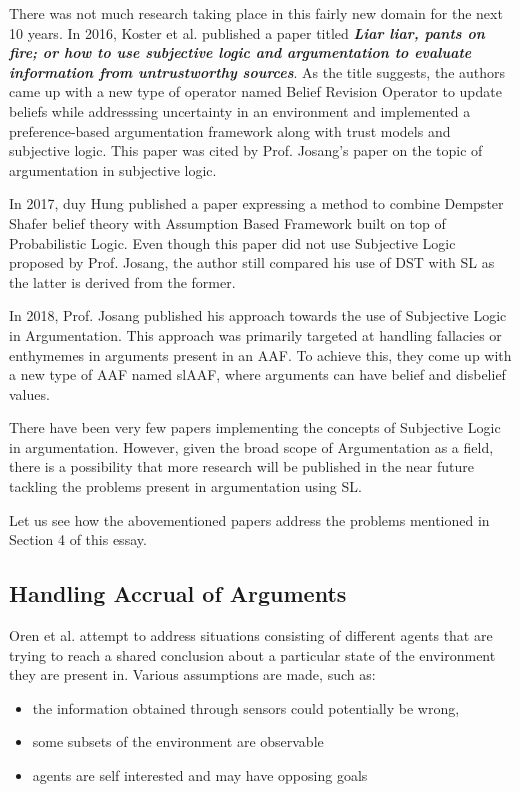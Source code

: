 \documentclass[sigconf]{acmart}
\begin{document}
There was not much research taking place in this fairly new domain for the next 10 years. In 2016, Koster et al. published a paper titled \textbf{\textit{Liar liar, pants on fire; or how to use subjective logic and argumentation to
evaluate information from untrustworthy sources}}. As the title suggests, the authors came up with a new type of operator named Belief Revision Operator to update beliefs while addresssing uncertainty in an environment and implemented a preference-based argumentation framework along with trust models and subjective logic. This paper was cited by Prof. Josang's paper on the topic of argumentation in subjective logic\cite{8455455}. 

In 2017, duy Hung published a paper \cite{8023355} expressing a method to combine Dempster Shafer belief theory with Assumption Based Framework built on top of Probabilistic Logic. Even though this paper did not use Subjective Logic proposed by Prof. Josang, the author still compared his use of DST with SL as the latter is derived from the former.

In 2018, Prof. Josang published his approach towards the use of Subjective Logic in Argumentation. This approach was primarily targeted at handling fallacies or enthymemes in arguments present in an AAF. To achieve this, they come up with a new type of AAF named slAAF, where arguments can have belief and disbelief values.

There have been very few papers implementing the concepts of Subjective Logic in argumentation. However, given the broad scope of Argumentation as a field, there is a possibility that more research will be published in the near future tackling the problems present in argumentation using SL.

Let us see how the abovementioned papers address the problems mentioned in Section 4 of this essay.

\subsection{Handling Accrual of Arguments}
Oren et al. \cite{OREN2007838} attempt to address situations consisting of different agents that are trying to reach a shared conclusion about a particular state of the environment 
they are present in. Various assumptions are made, such as: 
\begin{itemize}
  \item the information obtained through sensors could potentially be wrong, 
  \item some subsets of the environment are observable
  \item agents are self interested and may have opposing goals 
\end{itemize}
\end{document}
